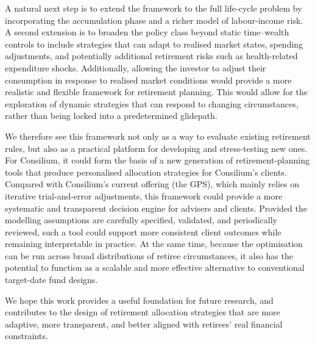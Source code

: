 \documentclass[11pt]{article}
\begin{document}
A natural next step is to extend the framework to the full life-cycle problem by incorporating the accumulation phase and a richer model of labour-income risk. A second extension is to broaden the policy class beyond static time--wealth controls to include strategies that can adapt to realised market states, spending adjustments, and potentially additional retirement risks such as health-related expenditure shocks. Additionally, allowing the investor to adjust their consumption in response to realised market conditions would provide a more realistic and flexible framework for retirement planning. This would allow for the exploration of dynamic strategies that can respond to changing circumstances, rather than being locked into a predetermined glidepath.

We therefore see this framework not only as a way to evaluate existing retirement rules, but also as a practical platform for developing and stress-testing new ones. For Consilium, it could form the basis of a new generation of retirement-planning tools that produce personalised allocation strategies for Consilium's clients. Compared with Consilium's current offering (the GPS), which mainly relies on iterative trial-and-error adjustments, this framework could provide a more systematic and transparent decision engine for advisers and clients. Provided the modelling assumptions are carefully specified, validated, and periodically reviewed, such a tool could support more consistent client outcomes while remaining interpretable in practice. At the same time, because the optimisation can be run across broad distributions of retiree circumstances, it also has the potential to function as a scalable and more effective alternative to conventional target-date fund designs.

We hope this work provides a useful foundation for future research, and contributes to the design of retirement allocation strategies that are more adaptive, more transparent, and better aligned with retirees' real financial constraints.
\end{document}
